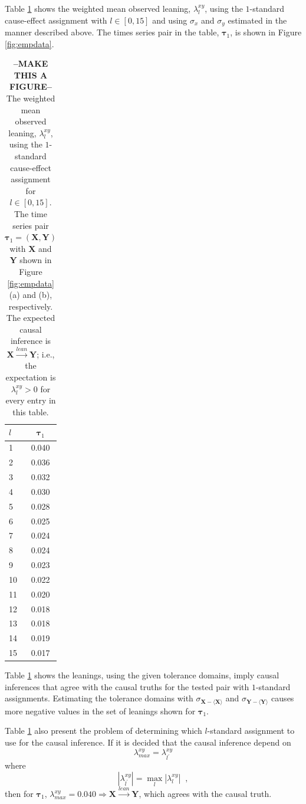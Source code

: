 \documentclass[a4paper,11pt,twocolumn]{article}
\begin{document}
Table \ref{tab:emp} shows the weighted mean observed leaning, $\lambda_l^{xy}$, using the $1$-standard cause-effect assignment with $l\in[0,15]$ and using $\sigma_x$ and $\sigma_y$ estimated in the manner described above.  The times series pair in the table, $\mathbf{\tau}_1$, is shown in Figure \ref{fig:empdata}.  
\begin{table}
\begin{tabular}{l|c}
 $l$ & $\mathbf{\tau}_1$ \\
\hline
 1 & 0.040 \\
 2 & 0.036 \\
 3 & 0.032 \\
 4 & 0.030 \\
 5 & 0.028 \\
 6 & 0.025 \\
 7 & 0.024 \\
 8 & 0.024 \\
 9 & 0.023 \\
 10 & 0.022 \\
 11 & 0.020 \\
 12 & 0.018 \\
 13 & 0.018 \\
 14 & 0.019 \\
 15 & 0.017 \\
\end{tabular} 
\caption{{\bf --MAKE THIS A FIGURE--} The weighted mean observed leaning, $\lambda_l^{xy}$, using the $1$-standard cause-effect assignment for $l\in[0,15]$.  The time series pair $\mathbf{\tau}_1 = (\mathbf{X},\mathbf{Y})$ with $\mathbf{X}$ and $\mathbf{Y}$ shown in Figure \ref{fig:empdata}(a) and (b), respectively.  The expected causal inference is $\mathbf{X}\xrightarrow{lean}\mathbf{Y}$; i.e., the expectation is $\lambda_l^{xy} > 0$ for every entry in this table.}
\label{tab:emp}
\end{table}

Table \ref{tab:emp} shows the leanings, using the given tolerance domains, imply causal inferences that agree with the causal truths for the tested pair with $1$-standard assignments.  Estimating the tolerance domains with $\sigma_{\mathbf{X}-\langle\mathbf{X}\rangle}$ and $\sigma_{\mathbf{Y}-\langle\mathbf{Y}\rangle}$ causes more negative values in the set of leanings shown for $\mathbf{\tau}_1$.  

Table \ref{tab:emp} also present the problem of determining which $l$-standard assignment to use for the causal inference.  If it is decided that the causal inference depend on
\begin{equation}
\lambda^{xy}_{max} = \lambda^{xy}_{l^\prime}
\end{equation}
where
\begin{equation}
|\lambda^{xy}_{l^\prime}| = \max_l |\lambda^{xy}_l|\;\;,
\end{equation}
then for $\mathbf{\tau}_1$, $\lambda^{xy}_{max}=0.040\Rightarrow\mathbf{X}\xrightarrow{lean}\mathbf{Y}$, which agrees with the causal truth.
\end{document}
